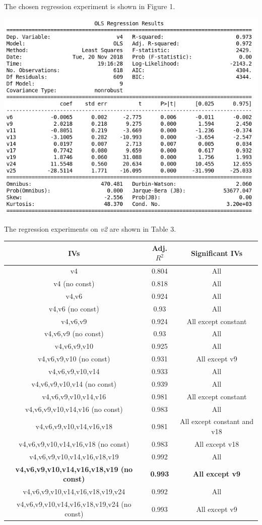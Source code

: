 \documentclass[12pt,a4paper]{article}
\begin{document}
The chosen regression experiment is shown in Figure 1.

\includegraphics[scale=0.5]{v4_reg.png}
\begingroup
{}
\endgroup

The regression experiments on \textit{v2} are shown in Table 3.\\


\begin{tabular}{|c|c|c|}
\hline 
\textbf{IVs} & \textbf{Adj. $R^2$} & \textbf{Significant IVs} \\ 
\hline 
v4 & 0.804 & All \\ 
\hline 
v4 (no const) & 0.818 & All \\ 
\hline 
v4,v6 & 0.924 & All \\ 
\hline 
v4,v6 (no const) & 0.93 & All \\ 
\hline 
v4,v6,v9 & 0.924 & All except constant \\ 
\hline 
v4,v6,v9 (no const) & 0.93 & All \\ 
\hline 
v4,v6,v9,v10 & 0.925 & All \\ 
\hline 
v4,v6,v9,v10 (no const) & 0.931 & All except v9 \\ 
\hline 
v4,v6,v9,v10,v14 & 0.933 & All \\ 
\hline 
v4,v6,v9,v10,v14 (no const) & 0.939 & All \\ 
\hline 
v4,v6,v9,v10,v14,v16 & 0.981 & All except constant  \\ 
\hline 
v4,v6,v9,v10,v14,v16 (no const) & 0.983 & All \\ 
\hline 
v4,v6,v9,v10,v14,v16,v18 & 0.981 & All except constant and v18 \\ 
\hline 
v4,v6,v9,v10,v14,v16,v18 (no const) & 0.983 & All except v18 \\ 
\hline 
v4,v6,v9,v10,v14,v16,v18,v19 & 0.992 & All \\ 
\hline 
\textbf{v4,v6,v9,v10,v14,v16,v18,v19 (no const)} & \textbf{0.993} & \textbf{All except v9} \\ 
\hline 
v4,v6,v9,v10,v14,v16,v18,v19,v24 & 0.992 & All \\ 
\hline 
v4,v6,v9,v10,v14,v16,v18,v19,v24 (no const) & 0.993 & All except v9 \\ 
\hline 
\end{tabular}
\end{document}
